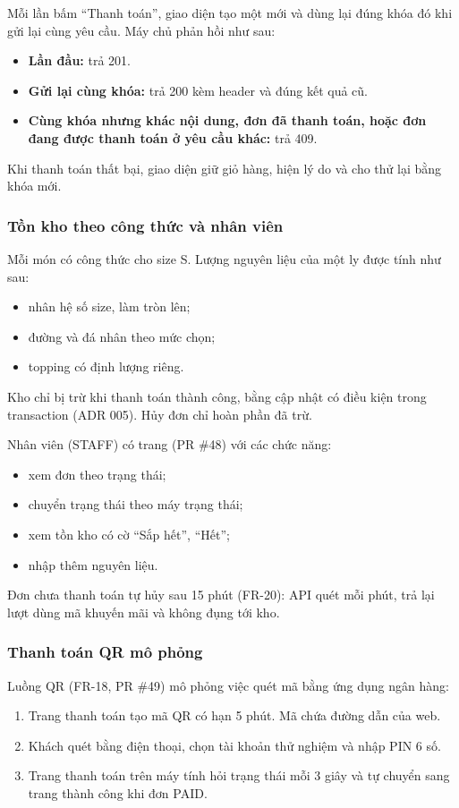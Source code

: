 Mỗi lần bấm ``Thanh toán'', giao diện tạo một  mới và dùng lại đúng khóa đó khi gửi lại cùng yêu cầu. Máy chủ phản hồi như sau:
\begin{itemize}
\item \textbf{Lần đầu:} trả 201.
\item \textbf{Gửi lại cùng khóa:} trả 200 kèm header  và đúng kết quả cũ.
\item \textbf{Cùng khóa nhưng khác nội dung, đơn đã thanh toán, hoặc đơn đang được thanh toán ở yêu cầu khác:} trả 409.
\end{itemize}

Khi thanh toán thất bại, giao diện giữ giỏ hàng, hiện lý do và cho thử lại bằng khóa mới.

\subsubsection{Tồn kho theo công thức và nhân viên}
Mỗi món có công thức cho size S. Lượng nguyên liệu của một ly được tính như sau:
\begin{itemize}
\item nhân hệ số size, làm tròn lên;
\item đường và đá nhân theo mức chọn;
\item topping có định lượng riêng.
\end{itemize}

Kho chỉ bị trừ khi thanh toán thành công, bằng cập nhật có điều kiện trong transaction (ADR 005). Hủy đơn chỉ hoàn phần đã trừ.

Nhân viên (STAFF) có trang  (PR \#48) với các chức năng:
\begin{itemize}
\item xem đơn theo trạng thái;
\item chuyển trạng thái theo máy trạng thái;
\item xem tồn kho có cờ ``Sắp hết'', ``Hết'';
\item nhập thêm nguyên liệu.
\end{itemize}

Đơn chưa thanh toán tự hủy sau 15 phút (FR-20): API quét mỗi phút, trả lại lượt dùng mã khuyến mãi và không đụng tới kho.

\subsubsection{Thanh toán QR mô phỏng}
Luồng QR (FR-18, PR \#49) mô phỏng việc quét mã bằng ứng dụng ngân hàng:
\begin{enumerate}
\item Trang thanh toán tạo mã QR có hạn 5 phút. Mã chứa đường dẫn  của web.
\item Khách quét bằng điện thoại, chọn tài khoản thử nghiệm và nhập PIN 6 số.
\item Trang thanh toán trên máy tính hỏi trạng thái mỗi 3 giây và tự chuyển sang trang thành công khi đơn PAID.
\end{enumerate}

